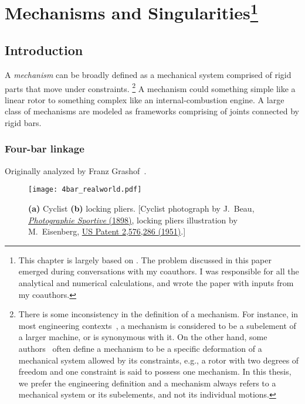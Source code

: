 
\chapter[Mechanisms and Singularities]{Mechanisms and Singularities\footnote{%
  This chapter is largely based on .
  The problem discussed in this paper emerged during conversations with my coauthors.
  I was responsible for all the analytical and numerical calculations, and wrote the paper with inputs from my coauthors.
}}


\section{Introduction}

A \emph{mechanism} can be broadly defined as a mechanical system comprised of rigid parts that move under constraints.%
\footnote{There is some inconsistency in the definition of a mechanism.
  For instance, in most engineering contexts~\cite{hartenberg1964,hunt1978,myszka2012}, a mechanism is considered to be a subelement of a larger machine, or is synonymous with it.
  On the other hand, some authors~\cite{connelly2015} often define a mechanism to be a specific deformation of a mechanical system allowed by its constraints, e.g., a rotor with two degrees of freedom and one constraint is said to possess one mechanism.
  In this thesis, we prefer the engineering definition and a mechanism always refers to a mechanical system or its subelements, and not its individual motions.}
A mechanism could something simple like a linear rotor to something complex like an internal-combustion engine.
A large class of mechanisms are modeled as frameworks comprising of joints connected by rigid bars.

\subsection{Four-bar linkage}

Originally analyzed by Franz Grashof~\cite[pp.~113--118]{grashof1883}.
%
\begin{figure}
  \begin{center}
    \texttt{[image: 4bar\_realworld.pdf]}
  \end{center}
\caption{\textbf{(a)} Cyclist \textbf{(b)} locking pliers.
  {\footnotesize [Cyclist photograph by J.~Beau, \href{https://gallica.bnf.fr/ark:/12148/btv1b8433328}{\emph{Photographie Sportive} (1898)}, locking pliers illustration by M.~Eisenberg, \href{https://patents.google.com/patent/US2576286A}{US Patent 2,576,286 (1951)}.]}
}
  \label{fig:4bar_realworld}
\end{figure}

